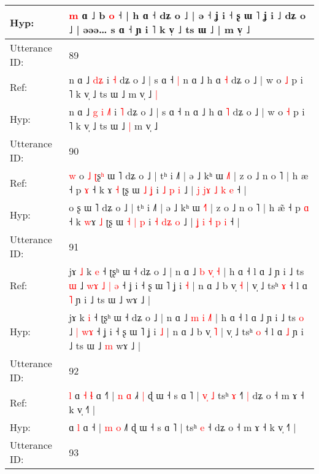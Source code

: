 \documentclass[10pt]{article}
\DeclareRobustCommand{\hl}[1]{{\textcolor{red}{#1}}}
\begin{document}
\begin{longtable}{ll}
 \\
Hyp: & \hl{m} ɑ ˩ b \hl{}\hl{o} ˧ | h ɑ ˧ dʑ o ˩ | ə ˧ ʝ i ˧ ʂ ɯ ˥ ʝ i ˩ dʑ o ˩ | əəə… s ɑ ˧ ɲ i ˥ k v̩ ˩ ts ɯ ˩ | m v̩ ˩
 \\
\midrule
Utterance ID: & 89 \\
Ref: & n ɑ ˩\hl{}\hl{}\hl{}\hl{} \hl{d}\hl{ʑ} i \hl{˧} dʑ o ˩ | s ɑ ˧\hl{ }\hl{|} n ɑ ˩ h ɑ \hl{˧} dʑ o ˩ | w o \hl{˩} p i ˥ k v̩ ˩ ts ɯ ˩\hl{}\hl{} m v̩ ˩\hl{ }\hl{|}
 \\
Hyp: & n ɑ ˩\hl{ }\hl{g}\hl{ }\hl{i} \hl{˩}\hl{˥} i \hl{˥} dʑ o ˩ | s ɑ ˧\hl{}\hl{} n ɑ ˩ h ɑ \hl{˥} dʑ o ˩ | w o \hl{˧} p i ˥ k v̩ ˩ ts ɯ ˩\hl{ }\hl{|} m v̩ ˩\hl{}\hl{}
 \\
\midrule
Utterance ID: & 90 \\
Ref: & \hl{w}\hl{ }o\hl{ }\hl{˩} \hl{ʈ}ʂ\hl{ʰ} ɯ ˥ dʑ o ˩ | tʰ i ˩˥ | ə ˩ kʰ ɯ \hl{˩}˥ | z o ˩ n o ˥ | h æ\hl{} ˧ p \hl{ɤ} ˧ k \hl{}ɤ \hl{˧} ʈʂ ɯ\hl{}\hl{} \hl{˩} \hl{ʝ} i \hl{˩} \hl{}\hl{p} \hl{i} ˩ | \hl{j} \hl{j}\hl{ɤ} \hl{˩} \hl{k} \hl{e} ˧ |
 \\
Hyp: & \hl{}\hl{}o\hl{}\hl{} \hl{}ʂ\hl{} ɯ ˥ dʑ o ˩ | tʰ i ˩˥ | ə ˩ kʰ ɯ \hl{˧}˥ | z o ˩ n o ˥ | h æ\hl{̃} ˧ p \hl{ɑ} ˧ k \hl{w}ɤ \hl{˩} ʈʂ ɯ\hl{ }\hl{˧} \hl{|} \hl{p} i \hl{˧} \hl{d}\hl{ʑ} \hl{o} ˩ | \hl{ʝ} \hl{}\hl{i} \hl{˧} \hl{p} \hl{i} ˧ |
 \\
\midrule
Utterance ID: & 91 \\
Ref: & jɤ\hl{ }\hl{˩} k \hl{e} ˧ ʈʂʰ ɯ ˧ dʑ o ˩ | n ɑ ˩ \hl{b} \hl{v}\hl{̩}\hl{ }\hl{˧} | h ɑ ˧ l ɑ ˩ ɲ i ˩ ts \hl{ɯ} ˩\hl{ }\hl{w}\hl{ɤ} \hl{˩} \hl{|}\hl{ }\hl{ə} ˧ ʝ i ˧ ʂ ɯ ˥ ʝ i \hl{˧} | n ɑ ˩ b v̩ \hl{˧} | v̩ ˩ tsʰ \hl{ɤ} ˧ l ɑ \hl{˥} ɲ i ˩ ts ɯ ˩\hl{}\hl{} wɤ ˩ |
 \\
Hyp: & jɤ\hl{}\hl{} k \hl{i} ˧ ʈʂʰ ɯ ˧ dʑ o ˩ | n ɑ ˩ \hl{m} \hl{i}\hl{ }\hl{˩}\hl{˥} | h ɑ ˧ l ɑ ˩ ɲ i ˩ ts \hl{o} ˩\hl{}\hl{}\hl{} \hl{|} \hl{}\hl{w}\hl{ɤ} ˧ ʝ i ˧ ʂ ɯ ˥ ʝ i \hl{˩} | n ɑ ˩ b v̩ \hl{˥} | v̩ ˩ tsʰ \hl{o} ˧ l ɑ \hl{˩} ɲ i ˩ ts ɯ ˩\hl{ }\hl{m} wɤ ˩ |
 \\
\midrule
Utterance ID: & 92 \\
Ref: & \hl{l}\hl{ }ɑ\hl{ }\hl{˧} \hl{ɬ} ɑ ˧\hl{˥} | \hl{n} \hl{ɑ} ˩\hl{˧}\hl{ }\hl{|} ɖ ɯ ˧ s ɑ ˥ |\hl{ }\hl{v}\hl{̩}\hl{ }\hl{˩} tsʰ \hl{ɤ} ˧\hl{˥}\hl{ }\hl{|} dʑ o ˧ m ɤ ˧ k v̩ ˧˥ |
 \\
Hyp: & \hl{}\hl{}ɑ\hl{}\hl{} \hl{l} ɑ ˧\hl{} | \hl{m} \hl{o} ˩\hl{}\hl{}\hl{˥} ɖ ɯ ˧ s ɑ ˥ |\hl{}\hl{}\hl{}\hl{}\hl{} tsʰ \hl{e} ˧\hl{}\hl{}\hl{} dʑ o ˧ m ɤ ˧ k v̩ ˧˥ |
 \\
\midrule
Utterance ID: & 93 \\

\end{longtable}
\end{document}
